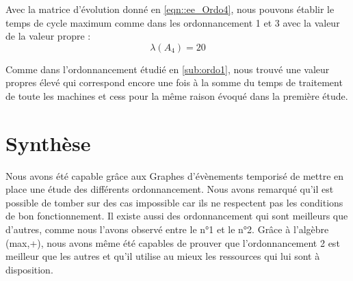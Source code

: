 Avec la matrice d'évolution donné en \ref{eqn::ee_Ordo4}, nous pouvons établir le temps de cycle maximum comme dans les ordonnancement 1 et 3 avec la valeur de la valeur propre :
\begin{equation}
\lambda(A_4) = 20
\end{equation}

Comme dans l'ordonnancement étudié en \ref{sub:ordo1}, nous trouvé une valeur propres élevé qui correspond encore une fois à la somme du temps de traitement de toute les machines et cess pour la même raison évoqué dans la première étude.

\section{Synthèse}
Nous avons été capable grâce aux Graphes d'évènements temporisé de mettre en place une étude des différents ordonnancement. Nous avons remarqué qu'il est possible de tomber sur des cas impossible car ils ne respectent pas les conditions de bon fonctionnement. Il existe aussi des ordonnancement qui sont meilleurs que d'autres, comme nous l'avons observé entre le n°1 et le n°2. Grâce à l'algèbre (max,+), nous avons même été capables de prouver que l'ordonnancement 2 est meilleur que les autres et qu'il utilise au mieux les ressources qui lui sont à disposition. 